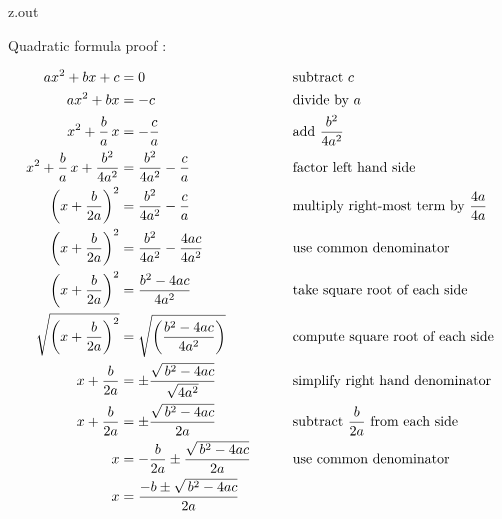 \begin{VerbatimOut}{z.out}

Quadratic formula proof
\cite{khan2018}:

{
  \addtolength{\jot}{6pt}
  \begin{alignat}{2}
    ax^2 + bx + c
      &= 0
      &
      &\text{subtract \(c\)}\\
    ax^2 + bx
      &= -c
      &
      &\text{divide by \(a\)}\notag\\
    x^2 + \frac ba\,x
      &= -\frac ca
      &
      &\text{add \(\displaystyle\frac{b^2}{4a^2}\)}\notag\\
    x^2+\frac ba\,x+\frac{b^2}{4a^2}
      &= \frac{b^2}{4a^2}-\frac ca
      &
      &\text{factor left hand side}\notag\\
    \left(x+\frac b{2a}\right)^2
      &= \frac{b^2}{4a^2}-\frac ca
      &
      &\text{multiply right-most term by \(\displaystyle\frac{4a}{4a}\)}\notag\\
    \left(x + \frac b{2a}\right)^2
      &= \frac{b^2}{4a^2}-\frac{4ac}{4a^2}
      &
      &\text{use common denominator}\notag\\
    \left(x + \frac b{2a}\right)^2
      &= \frac{b^2-4ac}{4a^2}
      &
      &\text{take square root of each side}\notag\\
    \sqrt{\left(x + \frac b{2a}\right)^2}
      &= \sqrt{\left(\frac{b^2-4ac}{4a^2}\right)}
      &
      &\text{compute square root of each side}\notag\\
    x + \frac b{2a}
      &= \pm \frac{\sqrt{\,b^2-4ac}}{\sqrt{4a^2}}
      &
      &\text{simplify right hand denominator}\notag\\
    x + \frac b{2a}
      &= \pm \frac{\sqrt{\,b^2-4ac}}{2a}
      &
      &\text{subtract \(\displaystyle\frac b{2a}\) from each side}\notag\\
    x
      &= -\frac b{2a} \pm \frac{\sqrt{\,b^2-4ac}}{2a}
      &\qquad
      &\text{use common denominator}\notag\\
    x
      &= \frac{-b \pm \sqrt{\,b^2-4ac}}{2a}
  \end{alignat}
}
\end{VerbatimOut}

\MyIO


